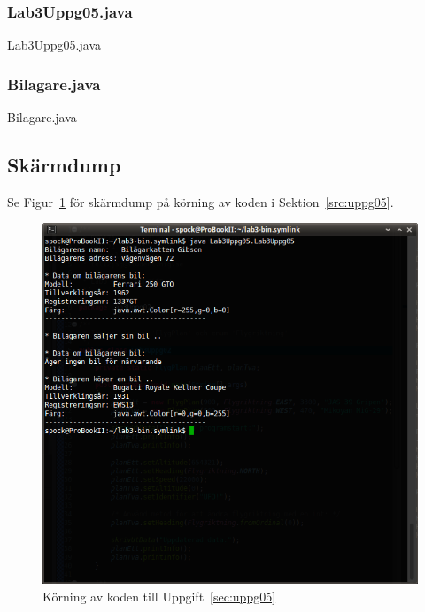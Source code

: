 \subsubsection{Lab3Uppg05.java}
\caption{Lab3Uppg05.java}
\label{src:uppg05}

\subsubsection{Bilagare.java}
\caption{Bilagare.java}
\label{src:bilagare}


\subsection{Skärmdump}
Se Figur~\ref{fig:uppg05-screenshot} för skärmdump på körning av koden i
Sektion~\ref{src:uppg05}.

\begin{figure}[htbp]
    \centering
        \includegraphics[width=\linewidth]{img/05.png}
    \caption{Körning av koden till Uppgift~\ref{sec:uppg05}}
    \label{fig:uppg05-screenshot}
\end{figure}

